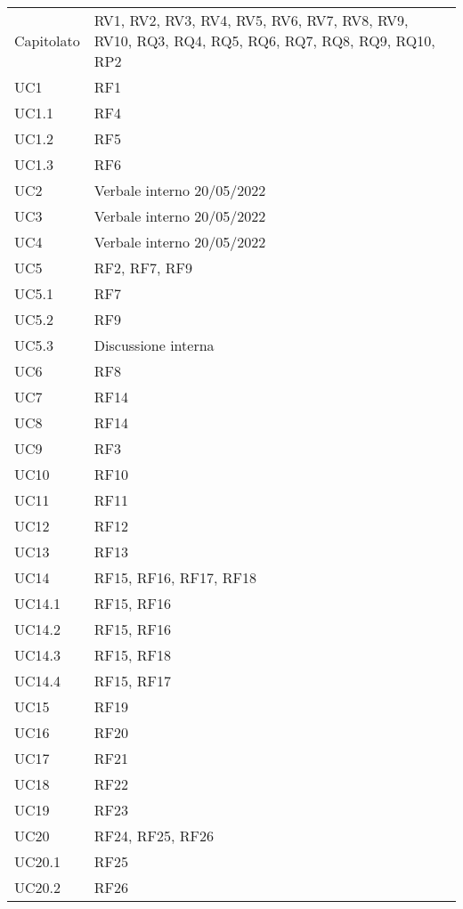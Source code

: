 {\begin{longtable}{C{.47\freewidth} C{.47\freewidth}}
      Capitolato & RV1, RV2, RV3, RV4, RV5, RV6, RV7, RV8, RV9, RV10,
                   RQ3, RQ4, RQ5, RQ6, RQ7, RQ8, RQ9, RQ10,
                   RP2\\
      UC1 & RF1\\
      UC1.1 & RF4\\
      UC1.2 & RF5\\
      UC1.3 & RF6\\
      UC2 & Verbale interno 20/05/2022\\
      UC3 & Verbale interno 20/05/2022\\
      UC4 & Verbale interno 20/05/2022\\
      UC5 & RF2, RF7, RF9\\
      UC5.1 & RF7\\
      UC5.2 & RF9\\
      UC5.3 & Discussione interna\\
      UC6 & RF8\\
      UC7 & RF14\\
      UC8 & RF14\\
      UC9 & RF3\\
      UC10 & RF10\\
      UC11 & RF11\\
      UC12 & RF12\\
      UC13 & RF13\\
      UC14 & RF15, RF16, RF17, RF18\\
      UC14.1 & RF15, RF16\\
      UC14.2 & RF15, RF16\\
      UC14.3 & RF15, RF18\\
      UC14.4 & RF15, RF17\\
      UC15 & RF19\\
      UC16 & RF20\\
      UC17 & RF21\\
      UC18 & RF22\\
      UC19 & RF23\\
      UC20 & RF24, RF25, RF26\\
      UC20.1 & RF25\\
      UC20.2 & RF26\\		
      \bottomrule
      \end{longtable}
}
\newpage
